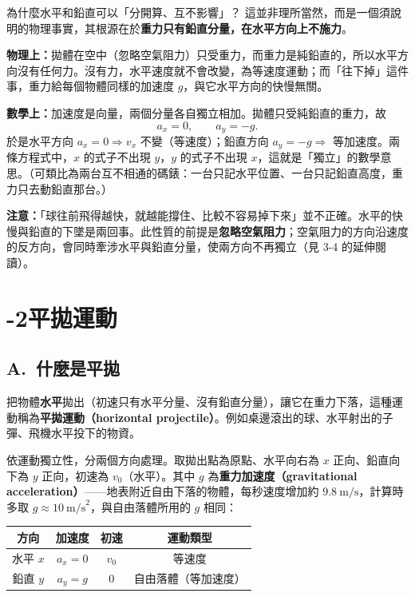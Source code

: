 \documentclass[11pt]{article}
\begin{document}
\begin{補充框}{為什麼水平和鉛直可以「分開算、互不影響」？}
這並非理所當然，而是一個須說明的物理事實，其根源在於\textbf{重力只有鉛直分量，在水平方向上不施力}。

\textbf{物理上：}拋體在空中（忽略空氣阻力）只受重力，而重力是純鉛直的，所以水平方向沒有任何力。沒有力，水平速度就不會改變，為等速度運動；而「往下掉」這件事，重力給每個物體同樣的加速度 $g$，與它水平方向的快慢無關。

\textbf{數學上：}加速度是向量，兩個分量各自獨立相加。拋體只受純鉛直的重力，故
$$a_x=0,\qquad a_y=-g.$$
於是水平方向 $a_x=0\Rightarrow v_x$ 不變（等速度）；鉛直方向 $a_y=-g\Rightarrow$ 等加速度。兩條方程式中，$x$ 的式子不出現 $y$，$y$ 的式子不出現 $x$，這就是「獨立」的數學意思。（可類比為兩台互不相通的碼錶：一台只記水平位置、一台只記鉛直高度，重力只去動鉛直那台。）

\textbf{注意：}「球往前飛得越快，就越能撐住、比較不容易掉下來」並不正確。水平的快慢與鉛直的下墜是兩回事。此性質的前提是\textbf{忽略空氣阻力}；空氣阻力的方向沿速度的反方向，會同時牽涉水平與鉛直分量，使兩方向不再獨立（見 3-4 的延伸閱讀）。
\end{補充框}


\section*{-2\quad 平拋運動}

\subsection*{\sffamily A.\ 什麼是平拋}

把物體\textbf{水平}拋出（初速只有水平分量、沒有鉛直分量），讓它在重力下落，這種運動稱為\textbf{平拋運動（horizontal projectile）}。例如桌邊滾出的球、水平射出的子彈、飛機水平投下的物資。

依運動獨立性，分兩個方向處理。取拋出點為原點、水平向右為 $x$ 正向、鉛直向下為 $y$ 正向，初速為 $v_0$（水平）。其中 $g$ 為\textbf{重力加速度（gravitational acceleration）}——地表附近自由下落的物體，每秒速度增加約 $9.8\ \text{m/s}$，計算時多取 $g\approx10\ \text{m/s}^2$，與自由落體所用的 $g$ 相同：

\begin{center}
\renewcommand{\arraystretch}{1.3}
\begin{tabular}{c c c c}
\hline
\textbf{方向} & \textbf{加速度} & \textbf{初速} & \textbf{運動類型} \\
\hline
水平 $x$ & $a_x=0$ & $v_0$ & 等速度 \\
鉛直 $y$ & $a_y=g$ & $0$ & 自由落體（等加速度） \\
\hline
\end{tabular}
\end{center}
\end{document}
